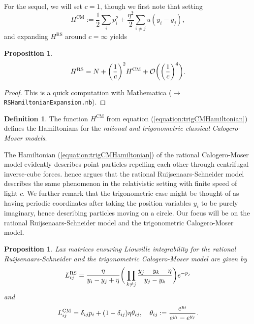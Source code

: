 \documentclass[11pt]{report}
\newtheorem{prop}[theorem]{Proposition}
\theoremstyle{definition}
\newtheorem{definition}[theorem]{Definition}
\theoremstyle{remark}
\theoremstyle{remark}
\begin{document}
For the sequel, we will set $c=1$, though we first note that setting
\begin{equation}\label{equation:trigCMHamiltonian}
H^\text{CM} := \frac{1}{2} \sum_i p_i^2 + \frac{\eta^2}{2} \sum_{i \neq j} u(y_i-y_j),
\end{equation}
and expanding $H^\text{RS}$ around $c = \infty$ yields

\begin{prop}
\begin{equation*}
H^\textnormal{RS} = N + \bigg( \frac{1}{c} \bigg)^2 H^\textnormal{CM} + \mathcal{O}\bigg( \bigg( \frac{1}{c} \bigg)^4 \bigg).
\end{equation*}
\end{prop}

\begin{proof}
This is a quick computation with Mathematica ($\to$ \texttt{RSHamiltonianExpansion.nb}).
\end{proof}

\begin{definition}
The function $H^\text{CM}$ from equation (\ref{equation:trigCMHamiltonian}) defines the Hamiltonians for the \emph{rational and trigonometric classical Calogero-Moser models}.
\end{definition}

The Hamiltonian (\ref{equation:trigCMHamiltonian}) of the rational Calogero-Moser model evidently describes point particles repelling each other through centrifugal inverse-cube forces. \cite{article:ruijsenaars:1987} hence argues that the rational Ruijsenaars-Schneider model describes the same phenomenon in the relativistic setting with finite speed of light $c$. We further remark that the trigonometric case might be thought of as having periodic coordinates after taking the position variables $y_i$ to be purely imaginary, hence describing particles moving on a circle. Our focus will be on the rational Ruijsenaars-Schneider model and the trigonometric Calogero-Moser model.

\begin{prop}
Lax matrices ensuring Liouville integrability for the rational Ruijsenaars-Schneider and the trigonometric Calogero-Moser model are given by
\begin{equation}\label{equation:RSLaxMatrix}
L_{ij}^\textnormal{RS} = \frac{\eta}{y_i-y_j+\eta} \bigg( \prod_{k \neq j} \frac{y_j-y_k-\eta}{y_j-y_k} \bigg) e^{-p_j}
\end{equation}
and
\begin{equation*}
L_{ij}^\textnormal{CM} = \delta_{ij} p_i + (1-\delta_{ij}) \eta \theta_{ij}, \quad \theta_{ij} := \frac{e^{y_i}}{e^{y_i}-e^{y_j}}.
\end{equation*}
\end{prop}
\end{document}
